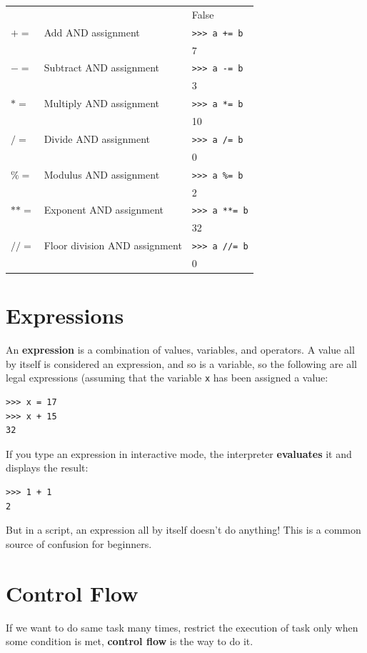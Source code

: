 \documentclass[10pt]{book}
\begin{document}
{\begin{tabular}{lll}
  &      & False \\
$+=$ & Add AND assignment & \verb">>> a += b" \\
  &      & 7 \\
$-=$ & Subtract AND assignment & \verb">>> a -= b" \\
  &      & 3 \\
 $*=$ & Multiply AND assignment & \verb">>> a *= b" \\
  &      & 10 \\
 $/=$ & Divide AND assignment & \verb">>> a /= b" \\
  &      & 0 \\
 $\%=$ & Modulus AND assignment & \verb">>> a %= b" \\
  &      & 2 \\
 $**=$ & Exponent AND assignment & \verb">>> a **= b" \\
  &      & 32 \\
 $//=$ & Floor division AND assignment & \verb">>> a //= b" \\
  &      & 0 \\
  \bottomrule
\end{tabular}


\section{Expressions}

An {\bf expression} is a combination of values, variables, and operators. A value all by itself is considered an expression, and so is
a variable, so the following are all legal expressions (assuming that the variable {\tt x} has been assigned a value:

\beforeverb
\begin{verbatim}
>>> x = 17
>>> x + 15
32
\end{verbatim}
\afterverb

If you type an expression in interactive mode, the interpreter {\bf evaluates} it and displays the result:

\beforeverb
\begin{verbatim}
>>> 1 + 1
2
\end{verbatim}
\afterverb
%
But in a script, an expression all by itself doesn't do anything!  This is a common source of confusion for beginners.


\section{Control Flow}
If we want to do same task many times, restrict the execution of task only when some condition is met, {\bf control flow} is the way to do it. 

}
\end{document}
